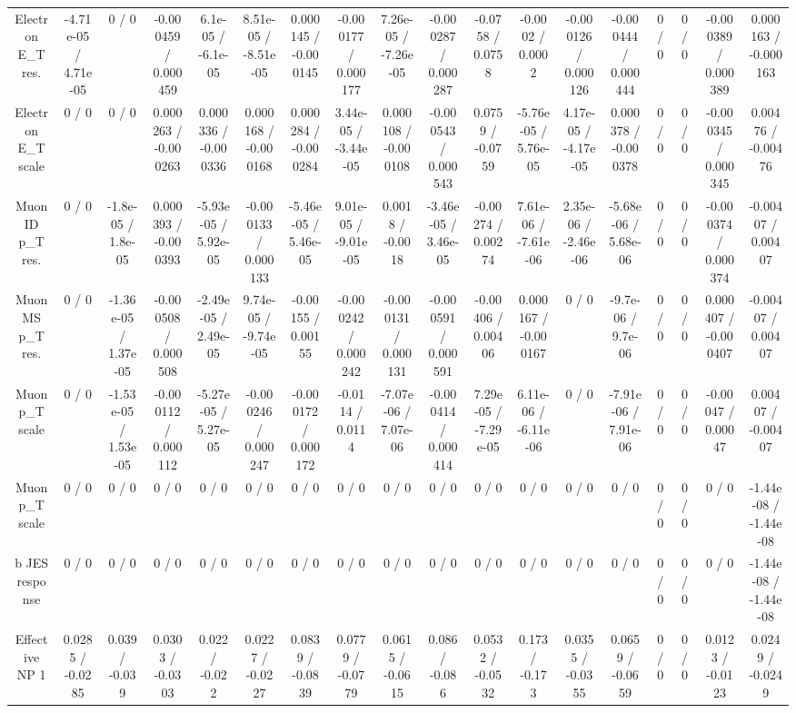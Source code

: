 \documentclass[10pt]{article}
\begin{document}
\begin{table}[htbp]
\begin{center}
\begin{tabular}{|c|c|c|c|c|c|c|c|c|c|c|c|c|c|c|c|c|c|}
  Electron E_{T} res. & -4.71e-05 / 4.71e-05 & 0 / 0 & -0.000459 / 0.000459 & 6.1e-05 / -6.1e-05 & 8.51e-05 / -8.51e-05 & 0.000145 / -0.000145 & -0.000177 / 0.000177 & 7.26e-05 / -7.26e-05 & -0.000287 / 0.000287 & -0.0758 / 0.0758 & -0.0002 / 0.0002 & -0.000126 / 0.000126 & -0.000444 / 0.000444 & 0 / 0 & 0 / 0 & -0.000389 / 0.000389 & 0.000163 / -0.000163 \\ 
  Electron E_{T} scale & 0 / 0 & 0 / 0 & 0.000263 / -0.000263 & 0.000336 / -0.000336 & 0.000168 / -0.000168 & 0.000284 / -0.000284 & 3.44e-05 / -3.44e-05 & 0.000108 / -0.000108 & -0.000543 / 0.000543 & 0.0759 / -0.0759 & -5.76e-05 / 5.76e-05 & 4.17e-05 / -4.17e-05 & 0.000378 / -0.000378 & 0 / 0 & 0 / 0 & -0.000345 / 0.000345 & 0.00476 / -0.00476 \\ 
  Muon ID p_{T} res. & 0 / 0 & -1.8e-05 / 1.8e-05 & 0.000393 / -0.000393 & -5.93e-05 / 5.92e-05 & -0.000133 / 0.000133 & -5.46e-05 / 5.46e-05 & 9.01e-05 / -9.01e-05 & 0.0018 / -0.0018 & -3.46e-05 / 3.46e-05 & -0.00274 / 0.00274 & 7.61e-06 / -7.61e-06 & 2.35e-06 / -2.46e-06 & -5.68e-06 / 5.68e-06 & 0 / 0 & 0 / 0 & -0.000374 / 0.000374 & -0.00407 / 0.00407 \\ 
  Muon MS p_{T} res. & 0 / 0 & -1.36e-05 / 1.37e-05 & -0.000508 / 0.000508 & -2.49e-05 / 2.49e-05 & 9.74e-05 / -9.74e-05 & -0.00155 / 0.00155 & -0.000242 / 0.000242 & -0.000131 / 0.000131 & -0.000591 / 0.000591 & -0.00406 / 0.00406 & 0.000167 / -0.000167 & 0 / 0 & -9.7e-06 / 9.7e-06 & 0 / 0 & 0 / 0 & 0.000407 / -0.000407 & -0.00407 / 0.00407 \\ 
  Muon p_{T} scale & 0 / 0 & -1.53e-05 / 1.53e-05 & -0.000112 / 0.000112 & -5.27e-05 / 5.27e-05 & -0.000246 / 0.000247 & -0.000172 / 0.000172 & -0.0114 / 0.0114 & -7.07e-06 / 7.07e-06 & -0.000414 / 0.000414 & 7.29e-05 / -7.29e-05 & 6.11e-06 / -6.11e-06 & 0 / 0 & -7.91e-06 / 7.91e-06 & 0 / 0 & 0 / 0 & -0.00047 / 0.00047 & 0.00407 / -0.00407 \\ 
  Muon p_{T} scale & 0 / 0 & 0 / 0 & 0 / 0 & 0 / 0 & 0 / 0 & 0 / 0 & 0 / 0 & 0 / 0 & 0 / 0 & 0 / 0 & 0 / 0 & 0 / 0 & 0 / 0 & 0 / 0 & 0 / 0 & 0 / 0 & -1.44e-08 / -1.44e-08 \\ 
  b JES response & 0 / 0 & 0 / 0 & 0 / 0 & 0 / 0 & 0 / 0 & 0 / 0 & 0 / 0 & 0 / 0 & 0 / 0 & 0 / 0 & 0 / 0 & 0 / 0 & 0 / 0 & 0 / 0 & 0 / 0 & 0 / 0 & -1.44e-08 / -1.44e-08 \\ 
  Effective NP 1 & 0.0285 / -0.0285 & 0.039 / -0.039 & 0.0303 / -0.0303 & 0.022 / -0.022 & 0.0227 / -0.0227 & 0.0839 / -0.0839 & 0.0779 / -0.0779 & 0.0615 / -0.0615 & 0.086 / -0.086 & 0.0532 / -0.0532 & 0.173 / -0.173 & 0.0355 / -0.0355 & 0.0659 / -0.0659 & 0 / 0 & 0 / 0 & 0.0123 / -0.0123 & 0.0249 / -0.0249 \\ 

\end{tabular}
\end{center}
\end{table}
\end{document}
